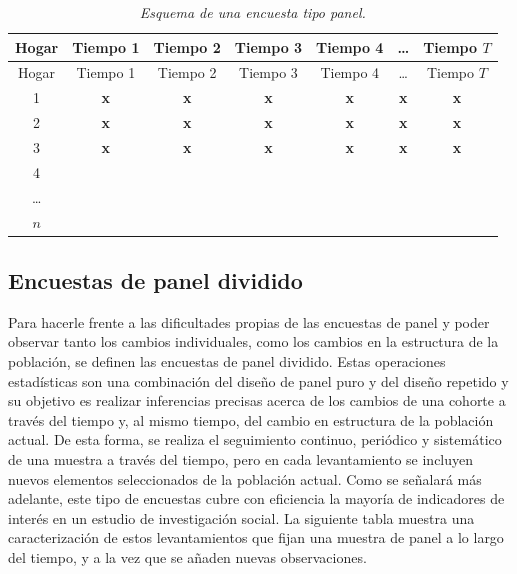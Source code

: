\documentclass[
  12pt,
  spanish,
]{book}
\begin{document}
\begin{longtable}[]{@{}ccccccc@{}}
\caption{\emph{Esquema de una encuesta tipo panel.}}\tabularnewline
\toprule
Hogar & Tiempo 1 & Tiempo 2 & Tiempo 3 & Tiempo 4 & \ldots{} & Tiempo \(T\) \\
\midrule
\endfirsthead
\toprule
Hogar & Tiempo 1 & Tiempo 2 & Tiempo 3 & Tiempo 4 & \ldots{} & Tiempo \(T\) \\
\midrule
\endhead
1 & \textbf{x} & \textbf{x} & \textbf{x} & \textbf{x} & \textbf{x} & \textbf{x} \\
2 & \textbf{x} & \textbf{x} & \textbf{x} & \textbf{x} & \textbf{x} & \textbf{x} \\
3 & \textbf{x} & \textbf{x} & \textbf{x} & \textbf{x} & \textbf{x} & \textbf{x} \\
4 & & & & & & \\
\ldots{} & & & & & & \\
\(n\) & & & & & & \\
\bottomrule
\end{longtable}

\hypertarget{encuestas-de-panel-dividido}{%
\subsection*{Encuestas de panel dividido}\label{encuestas-de-panel-dividido}}

Para hacerle frente a las dificultades propias de las encuestas de panel y poder observar tanto los cambios individuales, como los cambios en la estructura de la población, se definen las encuestas de panel dividido. Estas operaciones estadísticas son una combinación del diseño de panel puro y del diseño repetido y su objetivo es realizar inferencias precisas acerca de los cambios de una cohorte a través del tiempo y, al mismo tiempo, del cambio en estructura de la población actual. De esta forma, se realiza el seguimiento continuo, periódico y sistemático de una muestra a través del tiempo, pero en cada levantamiento se incluyen nuevos elementos seleccionados de la población actual. Como se señalará más adelante, este tipo de encuestas cubre con eficiencia la mayoría de indicadores de interés en un estudio de investigación social. La siguiente tabla muestra una caracterización de estos levantamientos que fijan una muestra de panel a lo largo del tiempo, y a la vez que se añaden nuevas observaciones.
\end{document}
